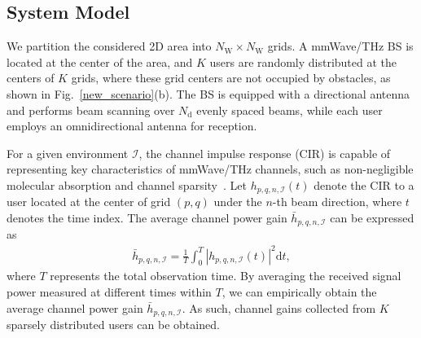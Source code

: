 \documentclass[journal,10pt,twocolumn]{IEEEtran}
\newcommand\IC{\ensuremath{\mathcal{I}}}
\newcommand\WR{\ensuremath{\mathrm{W}}}
\newcommand\dR{\ensuremath{\mathrm{d}}}
\newcommand\rx{\ensuremath{\mathrm{rx}}}
\newcommand\tx{\ensuremath{\mathrm{tx}}}
\begin{document}
\subsection{System Model}

We partition the considered 2D area into $N_{\WR} \times N_{\WR}$ grids. A mmWave/THz BS is located at the center of the area, and $K$ users are randomly distributed at the centers of $K$ grids, where these grid centers are not occupied by obstacles, as shown in Fig.~\ref{new_scenario}(b). The BS is equipped with a directional antenna and performs beam scanning over $N_{\dR}$ evenly spaced beams, while each user employs an omnidirectional antenna for reception. 



For a given environment $\IC$, the channel impulse response (CIR) is capable of representing key characteristics of mmWave/THz channels, such as non-negligible molecular absorption and channel sparsity~\cite{ning2023beamforming}. Let $h_{p,q,n,\IC}(t)$ denote the CIR to a user located at the center of grid $(p,q)$ under the $n$-th beam direction, where $t$ denotes the time index. The average channel power gain $\bar{h}_{p,q,n,\IC}$ can be expressed as 
\begin{align}
\bar{h}_{p,q,n,\IC}=\frac{1}{T} \int_{0}^{T} |h_{p,q,n,\IC}(t)|^{2} \dR t,		
\label{Model_2}
\end{align}where $T$ represents the total observation time. By averaging the received signal power measured at different times within $T$, we can empirically obtain the average channel power gain $\bar{h}_{p,q,n,\IC}$. As such, channel gains collected from $K$ sparsely distributed users can be obtained. 
\end{document}
